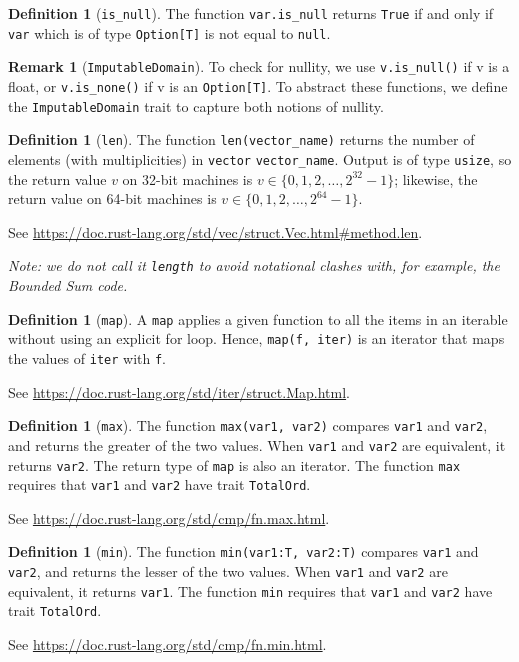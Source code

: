 \documentclass[11pt,a4paper]{article}
\theoremstyle{definition}
\newtheorem{remark}[theorem]{Remark}
\newtheorem{definition}[theorem]{Definition}
\newcommand{\inRust}[2]{See \url{#2}.}
\begin{document}
\begin{definition}[\texttt{is\_null}]
    The function \texttt{var.is\_null} returns \texttt{True} if and only if \texttt{var} which is of type \texttt{Option[T]} is not equal to \texttt{null}.
\end{definition}
\begin{remark}[\texttt{ImputableDomain}]
To check for nullity, we use \texttt{v.is\_null()} if v is a float, or \texttt{v.is\_none()} if v is an \texttt{Option[T]}. To abstract these functions, we define the \texttt{ImputableDomain} trait to capture both notions of nullity.
\end{remark}
\begin{definition}[\texttt{len}]
    The function \texttt{len(vector\_name)} returns the number of elements (with multiplicities) in \texttt{vector} \texttt{vector\_name}. Output is of type \texttt{usize}, so the return value $v$ on 32-bit machines is $v\in \{0,1,2,\ldots,2^{32} - 1\}$; likewise, the return value on 64-bit machines is $v\in \{0,1,2,\ldots,2^{64} - 1\}$. 
    
    \inRust{std::vec::Vec::len}{https://doc.rust-lang.org/std/vec/struct.Vec.html\#method.len}
\end{definition}
\emph{Note: we do not call it \texttt{length} to avoid notational clashes with, for example, the Bounded Sum code.}
\begin{definition}[\texttt{map}]
    A \texttt{map} applies a given function to all the items in an iterable without using an explicit for loop. Hence, \texttt{map(f, iter)} is an iterator that maps the values of \texttt{iter} with \texttt{f}.
    
    \inRust{Struct std::iter::Map}{https://doc.rust-lang.org/std/iter/struct.Map.html}
\end{definition}
\begin{definition}[\texttt{max}]
    The function \texttt{max(var1, var2)} compares \texttt{var1} and \texttt{var2}, and returns the greater of the two values. When \texttt{var1} and \texttt{var2} are equivalent, it returns \texttt{var2}. The return type of \texttt{map} is also an iterator. The function \texttt{max} requires that \texttt{var1} and \texttt{var2} have trait \texttt{TotalOrd}. 
    
    \inRust{std::cmp::max}{https://doc.rust-lang.org/std/cmp/fn.max.html}
\end{definition}
\begin{definition}[\texttt{min}]
    The function \texttt{min(var1:T, var2:T)} compares \texttt{var1} and \texttt{var2}, and returns the lesser of the two values. When \texttt{var1} and \texttt{var2} are equivalent, it returns \texttt{var1}. The function \texttt{min} requires that \texttt{var1} and \texttt{var2} have trait \texttt{TotalOrd}. 
    
    \inRust{std::cmp::min}{https://doc.rust-lang.org/std/cmp/fn.min.html}
\end{definition}
\end{document}
